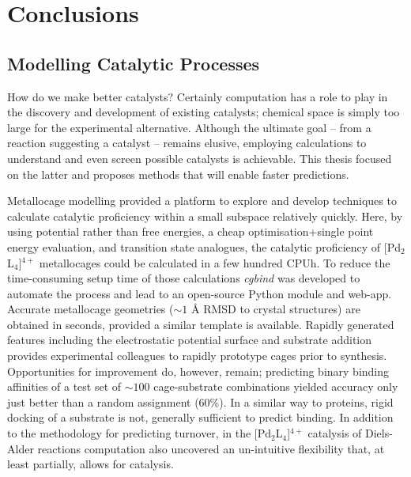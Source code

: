\documentclass[../main.tex]{subfiles}
\begin{document}
\setcounter{footnote}{0} 


\chapter{Conclusions}

\section{Modelling Catalytic Processes}

How do we make better catalysts? Certainly computation has a role to play in the discovery and development of existing catalysts; chemical space is simply too large for the experimental alternative. Although the ultimate goal -- from a reaction suggesting a catalyst -- remains elusive, employing calculations to understand and even screen possible catalysts is achievable. This thesis focused on the latter and proposes methods that will enable faster predictions.

Metallocage modelling provided a platform to explore and develop techniques to calculate catalytic proficiency within a small subspace relatively quickly. Here, by using potential rather than free energies, a cheap optimisation+single point energy evaluation, and transition state analogues, the catalytic proficiency of [Pd${}_2$L${}_4$]${}^{4+}$ metallocages could be calculated in a few hundred CPUh. To reduce the time-consuming setup time of those calculations \emph{cgbind} was developed to automate the process and lead to an open-source Python module and web-app. Accurate metallocage geometries ($\sim1$ \AA${}$ RMSD to crystal structures) are obtained in seconds, provided a similar template is available. Rapidly generated features including the electrostatic potential surface and substrate addition provides experimental colleagues to rapidly prototype cages prior to synthesis. Opportunities for improvement do, however, remain; predicting binary binding affinities of a test set of $\sim 100$ cage-substrate combinations yielded accuracy only just better than a random assignment (60\%). In a similar way to proteins, rigid docking of a substrate is not, generally sufficient to predict binding.\cite{Kitchen2004} In addition to the methodology for predicting turnover, in the [Pd${}_2$L${}_4$]${}^{4+}$ catalysis of Diels-Alder reactions computation also uncovered an un-intuitive flexibility that, at least partially, allows for catalysis. 
\end{document}
